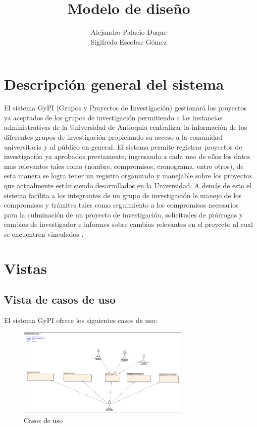 \documentclass[12pt,oneside,letterpaper]{report}
\title{Modelo de diseño}
\author{
Alejandro Palacio Duque\\
Sigifredo Escobar Gómez
}
\date{}
\begin{document}
\maketitle

\tableofcontents	%
\listoffigures		%

\newpage

\chapter{Descripción general del sistema}
\maketitle El sistema GyPI (Grupos y Proyectos de Investigación) gestionará los proyectos ya aceptados de los grupos de investigación permitiendo a las instancias administrativas de la Universidad de Antioquia centralizar la información de los diferentes grupos de investigación propiciando su acceso a la comunidad universitaria y al público en general.
El sistema permite registrar proyectos de investigación ya aprobados previamente, ingresando a cada uno de ellos los datos mas relevantes tales como (nombre, compromisos, cronograma, entre otros), de esta manera se logra tener un registro organizado y manejable sobre los proyectos que actualmente están siendo desarrollados en la Universidad. A demás de esto el sistema facilita a los  integrantes de un grupo de investigación le manejo de los compromisos y trámites tales como seguimiento a los compromisos necesarios para la culminación de un proyecto de investigación, solicitudes de prórrogas y cambios de investigador e informes sobre cambios relevantes en el proyecto al cual se encuentren vinculados .

\newpage

\chapter{Vistas}
\section{Vista de casos de uso}
\maketitle El sistema GyPI  ofrece los siguientes casos de uso:

\begin{figure}[h!]
  \centering
    \includegraphics[width=0.75\textwidth]{./img/img1.png}
  \caption{Casos de uso}
\end{figure}
\end{document}
